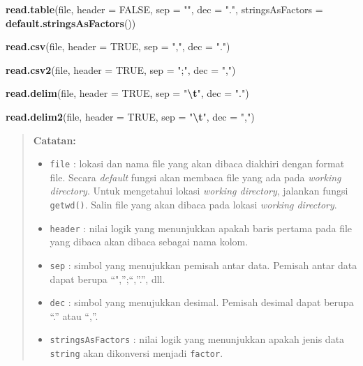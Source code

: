 \documentclass[
]{book}
\newenvironment{Shaded}{\begin{snugshade}}{\end{snugshade}}
\newcommand{\AttributeTok}[1]{\textcolor[rgb]{0.13,0.29,0.53}{#1}}
\newcommand{\ConstantTok}[1]{\textcolor[rgb]{0.56,0.35,0.01}{#1}}
\newcommand{\FunctionTok}[1]{\textcolor[rgb]{0.13,0.29,0.53}{\textbf{#1}}}
\newcommand{\NormalTok}[1]{#1}
\newcommand{\SpecialCharTok}[1]{\textcolor[rgb]{0.81,0.36,0.00}{\textbf{#1}}}
\newcommand{\StringTok}[1]{\textcolor[rgb]{0.31,0.60,0.02}{#1}}
\providecommand{\tightlist}{%
  \setlength{\itemsep}{0pt}\setlength{\parskip}{0pt}}
\theoremstyle{definition}
\theoremstyle{definition}
\theoremstyle{definition}
\theoremstyle{definition}
\theoremstyle{remark}
\begin{document}
\begin{Shaded}
\begin{Highlighting}[]
\FunctionTok{read.table}\NormalTok{(file, }\AttributeTok{header =} \ConstantTok{FALSE}\NormalTok{, }\AttributeTok{sep =} \StringTok{""}\NormalTok{, }\AttributeTok{dec =} \StringTok{"."}\NormalTok{,}
           \AttributeTok{stringsAsFactors =} \FunctionTok{default.stringsAsFactors}\NormalTok{())}

\FunctionTok{read.csv}\NormalTok{(file, }\AttributeTok{header =} \ConstantTok{TRUE}\NormalTok{, }\AttributeTok{sep =} \StringTok{","}\NormalTok{, }\AttributeTok{dec =} \StringTok{"."}\NormalTok{)}

\FunctionTok{read.csv2}\NormalTok{(file, }\AttributeTok{header =} \ConstantTok{TRUE}\NormalTok{, }\AttributeTok{sep =} \StringTok{";"}\NormalTok{, }\AttributeTok{dec =} \StringTok{","}\NormalTok{)}

\FunctionTok{read.delim}\NormalTok{(file, }\AttributeTok{header =} \ConstantTok{TRUE}\NormalTok{, }\AttributeTok{sep =} \StringTok{"}\SpecialCharTok{\textbackslash{}t}\StringTok{"}\NormalTok{, }\AttributeTok{dec =} \StringTok{"."}\NormalTok{)}

\FunctionTok{read.delim2}\NormalTok{(file, }\AttributeTok{header =} \ConstantTok{TRUE}\NormalTok{, }\AttributeTok{sep =} \StringTok{"}\SpecialCharTok{\textbackslash{}t}\StringTok{"}\NormalTok{, }\AttributeTok{dec =} \StringTok{","}\NormalTok{)}
\end{Highlighting}
\end{Shaded}

\begin{quote}
\textbf{Catatan:}

\begin{itemize}
\tightlist
\item
  \texttt{file} : lokasi dan nama file yang akan dibaca diakhiri dengan format file. Secara \emph{default} fungsi akan membaca file yang ada pada \emph{working directory}. Untuk mengetahui lokasi \emph{working directory}, jalankan fungsi \texttt{getwd()}. Salin file yang akan dibaca pada lokasi \emph{working directory}.
\item
  \texttt{header} : nilai logik yang menunjukkan apakah baris pertama pada file yang dibaca akan dibaca sebagai nama kolom.
\item
  \texttt{sep} : simbol yang menujukkan pemisah antar data. Pemisah antar data dapat berupa ``",'';``,''.'', dll.
\item
  \texttt{dec} : simbol yang menujukkan desimal. Pemisah desimal dapat berupa ``.'' atau ``,''.
\item
  \texttt{stringsAsFactors} : nilai logik yang menunjukkan apakah jenis data \texttt{string} akan dikonversi menjadi \texttt{factor}.
\end{itemize}
\end{quote}
\end{document}
